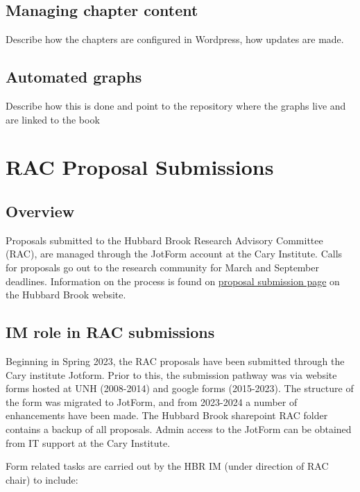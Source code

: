 \documentclass[
  letterpaper,
  DIV=11,
  numbers=noendperiod]{scrreprt}
\begin{document}
\section{Managing chapter content}\label{managing-chapter-content}

Describe how the chapters are configured in Wordpress, how updates are
made.

\section{Automated graphs}\label{automated-graphs}

Describe how this is done and point to the repository where the graphs
live and are linked to the book


\chapter{RAC Proposal Submissions}\label{rac-proposal-submissions}

\section{Overview}\label{overview-6}

Proposals submitted to the Hubbard Brook Research Advisory Committee
(RAC), are managed through the JotForm account at the Cary Institute.
Calls for proposals go out to the research community for March and
September deadlines. Information on the process is found on
\href{https://hubbardbrook.org/research-proposal-submission/}{proposal
submission page} on the Hubbard Brook website.

\section{IM role in RAC submissions}\label{im-role-in-rac-submissions}

Beginning in Spring 2023, the RAC proposals have been submitted through
the Cary institute Jotform. Prior to this, the submission pathway was
via website forms hosted at UNH (2008-2014) and google forms
(2015-2023). The structure of the form was migrated to JotForm, and from
2023-2024 a number of enhancements have been made. The Hubbard Brook
sharepoint RAC folder contains a backup of all proposals. Admin access
to the JotForm can be obtained from IT support at the Cary Institute.

Form related tasks are carried out by the HBR IM (under direction of RAC
chair) to include:
\end{document}
